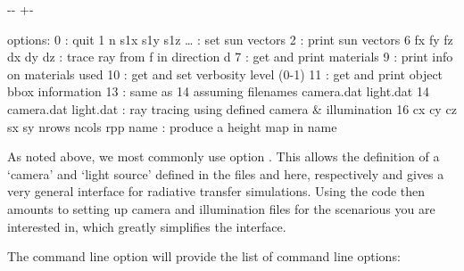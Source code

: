 \documentclass[letterpaper,10pt,english]{sphinxmanual}
\newlength\nbsphinxcodecellspacing
\begin{document}
{

\kern-\sphinxverbatimsmallskipamount\kern-\baselineskip
\kern+\FrameHeightAdjust\kern-\fboxrule
\vspace{\nbsphinxcodecellspacing}

\begin{sphinxVerbatim}[commandchars=\\\{\}]
options:
         0                   : quit
         1 n s1x s1y s1z {\ldots} : set sun vectors
         2                   : print sun vectors
         6 fx fy fz dx dy dz : trace ray from f in direction d
         7                   : get and print materials
         9                   : print info on materials used
         10                  : get and set verbosity level (0-1)
         11                  : get and print object bbox information
         13                  : same as 14 assuming filenames camera.dat light.dat
         14 camera.dat light.dat
                             : ray tracing using defined camera \& illumination
         16 cx cy cz sx sy nrows ncols rpp name
                             : produce a height map in name
\end{sphinxVerbatim}
}

As noted above, we most commonly use option . This allows the definition of a ‘camera’ and ‘light source’ defined in the files  and  here, respectively and gives a very general interface for radiative transfer simulations. Using the code then amounts to setting up camera and illumination files for the scenarious you are interested in, which greatly simplifies the interface.

The command line option  will provide the list of command line options:
\end{document}
